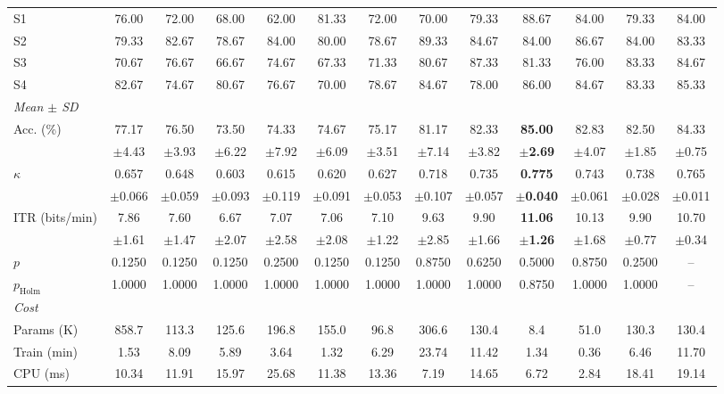 \documentclass[preprint,12pt]{elsarticle}
\begin{document}
\begin{table}
\begin{adjustbox}{max width=\dimexpr\textheight+80pt\relax}
\begin{tabular}{l@{\hspace{6pt}}cccccc@{\hspace{6pt}}cc@{\hspace{6pt}}ccc@{\hspace{6pt}}c}
S1 & 76.00 & 72.00 & 68.00 & 62.00 & 81.33 & 72.00 & 70.00 & 79.33 & $\mathbf{88.67}$ & 84.00 & 79.33 & 84.00 \\
S2 & 79.33 & 82.67 & 78.67 & 84.00 & 80.00 & 78.67 & $\mathbf{89.33}$ & 84.67 & 84.00 & 86.67 & 84.00 & 83.33 \\
S3 & 70.67 & 76.67 & 66.67 & 74.67 & 67.33 & 71.33 & 80.67 & $\mathbf{87.33}$ & 81.33 & 76.00 & 83.33 & 84.67 \\
S4 & 82.67 & 74.67 & 80.67 & 76.67 & 70.00 & 78.67 & 84.67 & 78.00 & $\mathbf{86.00}$ & 84.67 & 83.33 & 85.33 \\
\midrule
\multicolumn{13}{l}{\textit{Mean $\pm$ SD}} \\
Acc. (\%) & 77.17 & 76.50 & 73.50 & 74.33 & 74.67 & 75.17 & 81.17 & 82.33 & \textbf{85.00} & 82.83 & 82.50 & 84.33 \\
 & $\pm$4.43 & $\pm$3.93 & $\pm$6.22 & $\pm$7.92 & $\pm$6.09 & $\pm$3.51 & $\pm$7.14 & $\pm$3.82 & \textbf{$\pm$2.69} & $\pm$4.07 & $\pm$1.85 & $\pm$0.75 \\
$\kappa$ & 0.657 & 0.648 & 0.603 & 0.615 & 0.620 & 0.627 & 0.718 & 0.735 & \textbf{0.775} & 0.743 & 0.738 & 0.765 \\
 & $\pm$0.066 & $\pm$0.059 & $\pm$0.093 & $\pm$0.119 & $\pm$0.091 & $\pm$0.053 & $\pm$0.107 & $\pm$0.057 & \textbf{$\pm$0.040} & $\pm$0.061 & $\pm$0.028 & $\pm$0.011 \\
ITR (bits/min) & 7.86 & 7.60 & 6.67 & 7.07 & 7.06 & 7.10 & 9.63 & 9.90 & \textbf{11.06} & 10.13 & 9.90 & 10.70 \\
 & $\pm$1.61 & $\pm$1.47 & $\pm$2.07 & $\pm$2.58 & $\pm$2.08 & $\pm$1.22 & $\pm$2.85 & $\pm$1.66 & \textbf{$\pm$1.26} & $\pm$1.68 & $\pm$0.77 & $\pm$0.34 \\
\midrule
$p$ & 0.1250 & 0.1250 & 0.1250 & 0.2500 & 0.1250 & 0.1250 & 0.8750 & 0.6250 & 0.5000 & 0.8750 & 0.2500 & -- \\
$p_\mathrm{Holm}$ & 1.0000 & 1.0000 & 1.0000 & 1.0000 & 1.0000 & 1.0000 & 1.0000 & 1.0000 & 0.8750 & 1.0000 & 1.0000 & -- \\
\midrule
\multicolumn{13}{l}{\textit{Cost}} \\
Params (K) & 858.7 & 113.3 & 125.6 & 196.8 & 155.0 & 96.8 & 306.6 & 130.4 & 8.4 & 51.0 & 130.3 & 130.4 \\
Train (min) & 1.53 & 8.09 & 5.89 & 3.64 & 1.32 & 6.29 & 23.74 & 11.42 & 1.34 & 0.36 & 6.46 & 11.70 \\
CPU (ms) & 10.34 & 11.91 & 15.97 & 25.68 & 11.38 & 13.36 & 7.19 & 14.65 & 6.72 & 2.84 & 18.41 & 19.14 \\
\bottomrule
\end{tabular}
\end{adjustbox}
\end{table}
\end{document}
